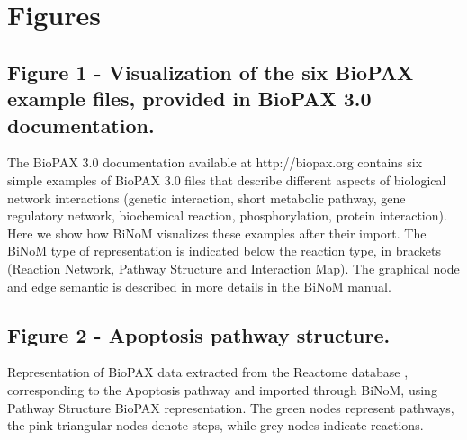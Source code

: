 \documentclass[10pt]{bmc_article}
\newenvironment{bmcformat}{\baselineskip20pt\sloppy\setboolean{publ}{false}}{\baselineskip20pt\sloppy}
\begin{document}
\begin{bmcformat}
\newpage
{
   }     %





\section*{Figures}

  \subsection*{Figure 1 - Visualization of the six BioPAX example files, provided in BioPAX 3.0 documentation.}
The BioPAX 3.0 documentation available at http://biopax.org contains six simple examples
of BioPAX 3.0 files that describe different aspects of biological network
interactions (genetic interaction, short metabolic pathway, gene regulatory
network, biochemical reaction, phosphorylation, protein interaction). Here we
show how BiNoM visualizes these examples after their import. The BiNoM type of
representation is indicated below the reaction type, in brackets (Reaction
Network, Pathway Structure and Interaction Map). The graphical node and edge
semantic is described in more details in the BiNoM manual.

  \subsection*{Figure 2 - Apoptosis pathway structure.}
Representation of BioPAX data extracted from the Reactome database
\cite{joshi2005reactome}, corresponding to the Apoptosis pathway and imported through
BiNoM, using Pathway Structure BioPAX representation. The green nodes represent pathways, the pink
triangular nodes denote steps, while grey nodes indicate reactions.


\end{bmcformat}
\end{document}
